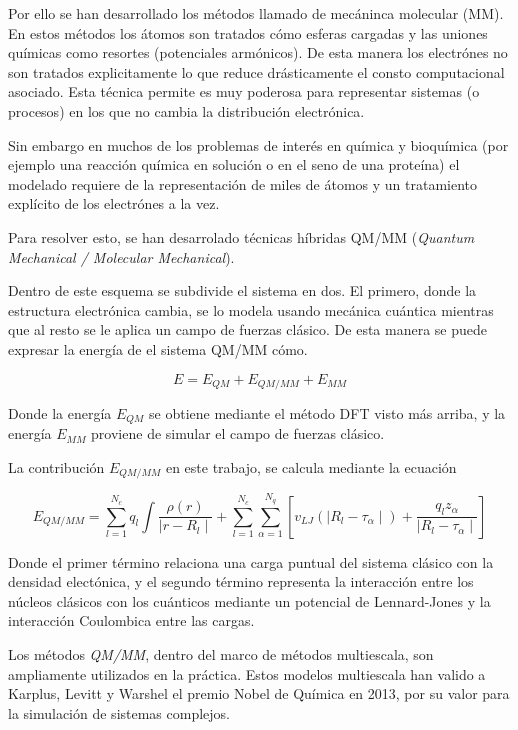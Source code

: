 Por ello se han desarrollado los métodos llamado de mecáninca molecular (MM). En estos métodos los átomos son tratados cómo esferas cargadas y las uniones químicas como resortes (potenciales armónicos).
De esta manera los electrónes no son tratados explicitamente lo que reduce drásticamente el consto computacional asociado. Esta técnica permite es muy poderosa para representar sistemas (o procesos) en los que no cambia la distribución
electrónica.

Sin embargo en muchos de los problemas de interés en química y bioquímica (por ejemplo una reacción química en solución o en el seno de una proteína)
 el modelado requiere de la representación de miles de átomos y un tratamiento explícito de los electrónes a la vez.

Para resolver esto, se han desarrolado técnicas híbridas QM/MM (\textit{Quantum Mechanical / Molecular Mechanical}).

Dentro de este esquema se subdivide el sistema en dos. El primero, donde la estructura electr\'onica cambia, se lo modela usando mecánica cuántica mientras que al resto se le aplica un campo de 
fuerzas clásico. De esta manera se puede expresar la energía de el sistema QM/MM cómo.

\begin{equation}
    E = E_{QM} + E_{QM/MM} + E_{MM}
\end{equation}

Donde la energ\'ia $E_{QM}$ se obtiene mediante el m\'etodo DFT visto m\'as arriba, y la energ\'ia
$E_{MM}$ proviene de simular el campo de fuerzas cl\'asico.

La contribuci\'on $E_{QM/MM}$ en este trabajo, se calcula mediante la ecuaci\'on

\begin{equation}
    E_{QM/MM} = \sum_{l = 1}^{N_c} q_l \int \frac{\rho(r)}{\mid r - R_l \mid} + \sum_{l = 1}^{N_c}\sum_{\alpha = 1}^{N_q} [ v_{LJ} ( \mid R_l - \tau_\alpha \mid ) + \frac{q_l z_\alpha}{\mid R_l - \tau_\alpha \mid} ]
\end{equation}

Donde el primer t\'ermino relaciona una carga puntual del sistema cl\'asico con la densidad
elect\'onica, y el segundo t\'ermino representa la interacci\'on entre los n\'ucleos cl\'asicos
con los cu\'anticos mediante un potencial de Lennard-Jones y la interacci\'on Coulombica entre
las cargas.

Los m\'etodos \textit{QM/MM}, dentro del marco de m\'etodos multiescala, son ampliamente utilizados en
la pr\'actica. Estos modelos multiescala han valido a Karplus, Levitt y
Warshel el premio Nobel de Qu\'imica en 2013, por su valor para la simulaci\'on de sistemas complejos.

